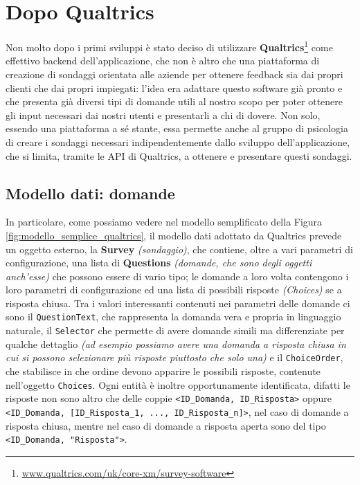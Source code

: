 \section{Dopo Qualtrics}
Non molto dopo i primi sviluppi è stato deciso di utilizzare \textbf{Qualtrics}\footnote{\url{www.qualtrics.com/uk/core-xm/survey-software}} come effettivo backend dell'applicazione, che non è altro che una piattaforma di creazione di sondaggi orientata alle aziende per ottenere feedback sia dai propri clienti che dai propri impiegati: l'idea era adattare questo software già pronto e che presenta già diversi tipi di domande utili al nostro scopo per poter ottenere gli input necessari dai nostri utenti e presentarli a chi di dovere. Non solo, essendo una piattaforma a sé stante, essa permette anche al gruppo di psicologia di creare i sondaggi necessari indipendentemente dallo sviluppo dell'applicazione, che si limita, tramite le API di Qualtrics, a ottenere e presentare questi sondaggi.

\subsection{Modello dati: domande}
In particolare, come possiamo vedere nel modello semplificato della Figura \ref{fig:modello_semplice_qualtrics}, il modello dati adottato da Qualtrics prevede un oggetto esterno, la \textbf{Survey} \textit{(sondaggio)}, che contiene, oltre a vari parametri di configurazione, una lista di \textbf{Questions} \textit{(domande, che sono degli oggetti anch'esse)} che possono essere di vario tipo; le domande a loro volta contengono i loro parametri di configurazione ed una lista di possibili risposte \textit{(Choices)} se a risposta chiusa.
Tra i valori interessanti contenuti nei parametri delle domande ci sono il \texttt{QuestionText}, che rappresenta la domanda vera e propria in linguaggio naturale, il \texttt{Selector} che permette di avere domande simili ma differenziate per qualche dettaglio \textit{(ad esempio possiamo avere una domanda a risposta chiusa in cui si possono selezionare più risposte piuttosto che solo una)} e il \texttt{ChoiceOrder}, che stabilisce in che ordine devono apparire le possibili risposte, contenute nell'oggetto \texttt{Choices}.
Ogni entità è inoltre opportunamente identificata, difatti le risposte non sono altro che delle coppie \texttt{<ID\_Domanda, ID\_Risposta>} oppure \texttt{<ID\_Domanda, [ID\_Risposta\_1, ..., ID\_Risposta\_n]>}, nel caso di domande a risposta chiusa, mentre nel caso di domande a risposta aperta sono del tipo \texttt{<ID\_Domanda, "Risposta">}.


